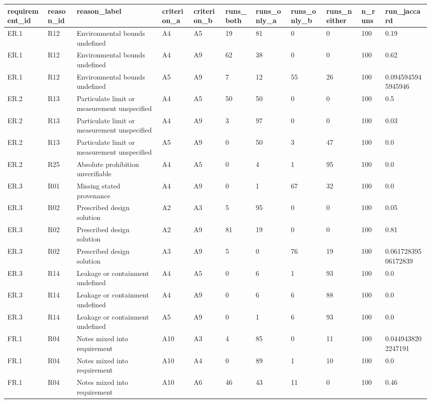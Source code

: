 \begin{tabular}{lllllllllll}
\hline
requirement\_id & reason\_id & reason\_label & criterion\_a & criterion\_b & runs\_both & runs\_only\_a & runs\_only\_b & runs\_neither & n\_runs & run\_jaccard \\
\hline
ER.1 & R12 & Environmental bounds undefined & A4 & A5 & 19 & 81 & 0 & 0 & 100 & 0.19 \\
ER.1 & R12 & Environmental bounds undefined & A4 & A9 & 62 & 38 & 0 & 0 & 100 & 0.62 \\
ER.1 & R12 & Environmental bounds undefined & A5 & A9 & 7 & 12 & 55 & 26 & 100 & 0.0945945945945946 \\
ER.2 & R13 & Particulate limit or measurement unspecified & A4 & A5 & 50 & 50 & 0 & 0 & 100 & 0.5 \\
ER.2 & R13 & Particulate limit or measurement unspecified & A4 & A9 & 3 & 97 & 0 & 0 & 100 & 0.03 \\
ER.2 & R13 & Particulate limit or measurement unspecified & A5 & A9 & 0 & 50 & 3 & 47 & 100 & 0.0 \\
ER.2 & R25 & Absolute prohibition unverifiable & A4 & A5 & 0 & 4 & 1 & 95 & 100 & 0.0 \\
ER.3 & R01 & Missing stated provenance & A4 & A9 & 0 & 1 & 67 & 32 & 100 & 0.0 \\
ER.3 & R02 & Prescribed design solution & A2 & A3 & 5 & 95 & 0 & 0 & 100 & 0.05 \\
ER.3 & R02 & Prescribed design solution & A2 & A9 & 81 & 19 & 0 & 0 & 100 & 0.81 \\
ER.3 & R02 & Prescribed design solution & A3 & A9 & 5 & 0 & 76 & 19 & 100 & 0.06172839506172839 \\
ER.3 & R14 & Leakage or containment undefined & A4 & A5 & 0 & 6 & 1 & 93 & 100 & 0.0 \\
ER.3 & R14 & Leakage or containment undefined & A4 & A9 & 0 & 6 & 6 & 88 & 100 & 0.0 \\
ER.3 & R14 & Leakage or containment undefined & A5 & A9 & 0 & 1 & 6 & 93 & 100 & 0.0 \\
FR.1 & R04 & Notes mixed into requirement & A10 & A3 & 4 & 85 & 0 & 11 & 100 & 0.0449438202247191 \\
FR.1 & R04 & Notes mixed into requirement & A10 & A4 & 0 & 89 & 1 & 10 & 100 & 0.0 \\
FR.1 & R04 & Notes mixed into requirement & A10 & A6 & 46 & 43 & 11 & 0 & 100 & 0.46 \\

\end{tabular}
